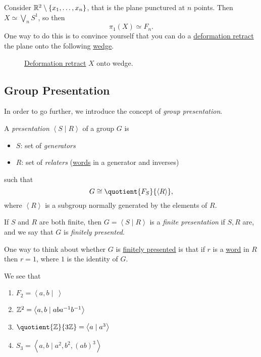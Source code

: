 \begin{exercise}
	Consider \(\mathbb{\MakeUppercase{r}} ^2 \setminus \{x_1, \ldots , x_n \}\), that is the plane punctured at \(n\) points. Then \(X \simeq \bigvee_n S^1\), so then
	\[
		\pi _1(X)\simeq F_n.
	\]
	One way to do this is to convince yourself that you can do a \hyperref[def:deformation-retraction]{deformation retract} the plane onto the following \hyperref[sssec:Wedge-sum]{wedge}.
	\begin{figure}[H]
		\centering
		\caption{\hyperref[def:deformation-retraction]{Deformation retract} \(X\) onto wedge.}
		\label{fig:lec11:ex}
	\end{figure}
\end{exercise}

\subsection{Group Presentation}
In order to go further, we introduce the concept of \emph{group presentation}.
\begin{definition}\label{def:group-presentation}
	A \emph{presentation} \(\left< S \mid R \right> \) of a group \(G\) is
	\begin{itemize}
		\item \(S\): set of \emph{generators}
		\item \(R\): set of \emph{relaters} (\hyperref[def:word]{words} in a generator and inverses)
	\end{itemize}
	such that
	\[
		G\cong \quotient{F_S}{\left< R \right>},
	\]
	where \(\left< R \right> \) is a subgroup normally generated by the elements of \(R\).
\end{definition}

\begin{definition}\label{def:finite-presentation}
	If \(S\) and \(R\) are both finite, then \(G = \left< S \mid R \right> \) is a \emph{finite presentation} if \(S, R\) are, and we say that \(G\) is \emph{finitely presented}.
\end{definition}
\begin{note}
	One way to think about whether \(G\) is \hyperref[def:finite-presentation]{\underline{finitely presented}} is that if \(r\) is a
	\hyperref[def:word]{word} in \(R\) then \(r = 1\), where \(1\) is the identity of \(G\).
\end{note}

\begin{eg}
	We see that
	\begin{enumerate}
		\item \(F_2 = \left< a, b \mid\ \right> \)
		\item \(\mathbb{\MakeUppercase{z}} ^2 = \left< a, b \mid aba^{-1} b^{-1}  \right> \)
		\item \(\quotient{\mathbb{\MakeUppercase{z}}}{3\mathbb{\MakeUppercase{z}}} = \left< a \mid a^3 \right> \)
		\item \(S_3 = \left< a, b \mid a^2, b^2, (ab)^3 \right> \)
	\end{enumerate}
\end{eg}

